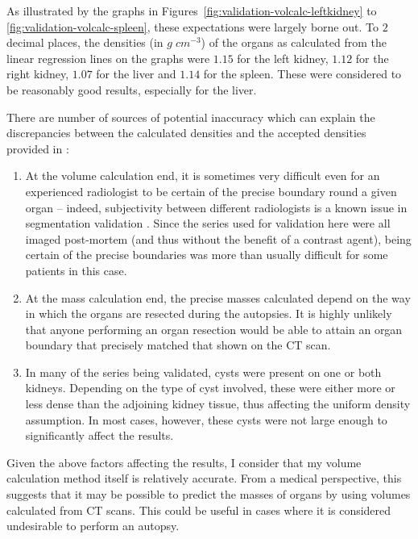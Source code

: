 As illustrated by the graphs in Figures~\ref{fig:validation-volcalc-leftkidney} to \ref{fig:validation-volcalc-spleen}, these expectations were largely borne out. To $2$ decimal places, the densities (in $g \; \mathit{cm}^{-3}$) of the organs as calculated from the linear regression lines on the graphs were $1.15$ for the left kidney, $1.12$ for the right kidney, $1.07$ for the liver and $1.14$ for the spleen. These were considered to be reasonably good results, especially for the liver.

There are number of sources of potential inaccuracy which can explain the discrepancies between the calculated densities and the accepted densities provided in \cite{woodard86}:
%
\begin{enumerate}

\item At the volume calculation end, it is sometimes very difficult even for an experienced radiologist to be certain of the precise boundary round a given organ -- indeed, subjectivity between different radiologists is a known issue in segmentation validation \cite{?}. Since the series used for validation here were all imaged post-mortem (and thus without the benefit of a contrast agent), being certain of the precise boundaries was more than usually difficult for some patients in this case.

\item At the mass calculation end, the precise masses calculated depend on the way in which the organs are resected during the autopsies. It is highly unlikely that anyone performing an organ resection would be able to attain an organ boundary that precisely matched that shown on the CT scan.


\item In many of the series being validated, cysts were present on one or both kidneys. Depending on the type of cyst involved, these were either more or less dense than the adjoining kidney tissue, thus affecting the uniform density assumption. In most cases, however, these cysts were not large enough to significantly affect the results.

\end{enumerate}
%
Given the above factors affecting the results, I consider that my volume calculation method itself is relatively accurate. From a medical perspective, this suggests that it may be possible to predict the masses of organs by using volumes calculated from CT scans. This could be useful in cases where it is considered undesirable to perform an autopsy.

